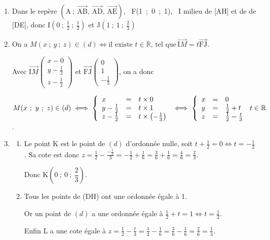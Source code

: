 \documentclass[10pt]{article}
\providecommand{\R}{\mathbb{R}}
\providecommand{\vect}[1]{\overrightarrow{#1}}
\begin{document}
\begin{enumerate}
\item 
Dans le repère $\left(\text{A}~;~\vect{\text{AB}},\,\vect{\text{AD}},\, \vect{\text{AE}}\right)$, \, F(1~;~0~;~1), \, I milieu de [AH] et de de [DE], donc I$\left(0~;~\frac{1}{2}~;~\frac{1}{2}\right)$ et J$\left(1~;~1~;~\frac{2}{3}\right)$

\item 
On a $M(x~;~y~;~z) \in (d) \iff \text{il existe } t \in \R,\, \text{tel que}\, \vect{\text{I}M} = t\vect{\text{FJ}}$.

Avec $\vect{\text{I}M}\begin{pmatrix}x - 0\\y - \frac{1}{2}\\z - \frac{1}{2}\end{pmatrix}$ et 
$\vect{\text{FJ}}\begin{pmatrix}0\\1\\-\frac{1}{3}\end{pmatrix}$, on a donc 

$M(x~;~y~;~z) \in (d) \iff \left\{\begin{array}{l c l}
x&=&t \times 0\\
y - \frac{1}{2}&=&t \times 1\\
z - \frac{1}{2}&=&t \times \left( -\frac{1}{3}\right)
\end{array}\right. \iff \left\{\begin{array}{l c l}
x&=&0\\
y &=&\frac{1}{2} + t \\
z &=&\frac{1}{2} -\frac{t}{3}
\end{array}\right.\, t \in \R$.
\item 
	\begin{enumerate}
		\item 
Le point K est le point de $(d)$ d'ordonnée nulle, soit $t + \frac{1}{2} = 0 \iff t = - \frac{1}{2}$. Sa cote est donc $z = \frac{1}{2} - \frac{- \frac{1}{2}}{3} = - \frac{1}{2} + \frac{1}{6} = \frac{3}{6} + \frac{1}{6} = \frac{4}{6} = \frac{2}{3}$.
		
Donc K$\left(0~;~ 0~;~\dfrac{2}{3}\right)$.
		\item 
		Tous les points de (DH) ont une ordonnée égale à 1.

Or un point de $(d)$ a une ordonnée égale à $\frac{1}{2} + t = 1 \iff t = \frac{1}{2} $.

Enfin L a une cote égale à $z = \frac{1}{2} - \frac{t}{3} = \frac{1}{2} - \frac{1}{6}  = \frac{3}{6} - \frac{1}{6} = \frac{2}{6} = \frac{1}{3}$.


\end{enumerate}
\end{enumerate}
\end{document}
